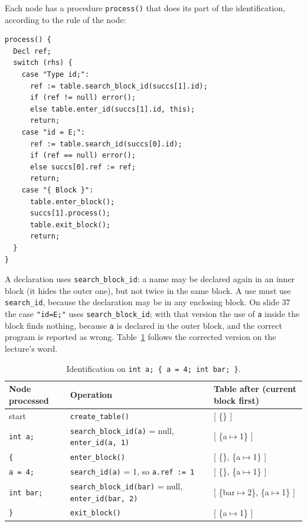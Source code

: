 Each node has a procedure \texttt{process()} that does its part of the
identification, according to the rule of the node:
\begin{lstlisting}
process() {
  Decl ref;
  switch (rhs) {
    case "Type id;":
      ref := table.search_block_id(succs[1].id);
      if (ref != null) error();
      else table.enter_id(succs[1].id, this);
      return;
    case "id = E;":
      ref := table.search_id(succs[0].id);
      if (ref == null) error();
      else succs[0].ref := ref;
      return;
    case "{ Block }":
      table.enter_block();
      succs[1].process();
      table.exit_block();
      return;
  }
}
\end{lstlisting}
A declaration uses \texttt{search\_block\_id}: a name may be declared again in
an inner block (it hides the outer one), but not twice in the same block. A
use must use \texttt{search\_id}, because the declaration may be in any
enclosing block. On slide 37 the case \texttt{"id=E;"} uses
\texttt{search\_block\_id}; with that version the use of \texttt{a} inside the
block finds nothing, because \texttt{a} is declared in the outer block, and the
correct program is reported as wrong. Table~\ref{tab:process} follows the
corrected version on the lecture's word.

\begin{table}[h]
\centering
\small
\begin{tabular}{l l l}
  \toprule
  Node processed & Operation & Table after (current block first) \\
  \midrule
  start              & \texttt{create\_table()}                 & [ \{\} ] \\
  \texttt{int a;}    & \texttt{search\_block\_id(a)} = null, \texttt{enter\_id(a, 1)} & [ \{a$\mapsto$1\} ] \\
  \texttt{\{}        & \texttt{enter\_block()}                  & [ \{\}, \{a$\mapsto$1\} ] \\
  \texttt{a = 4;}    & \texttt{search\_id(a)} = 1, so \texttt{a.ref := 1} & [ \{\}, \{a$\mapsto$1\} ] \\
  \texttt{int bar;}  & \texttt{search\_block\_id(bar)} = null, \texttt{enter\_id(bar, 2)} & [ \{bar$\mapsto$2\}, \{a$\mapsto$1\} ] \\
  \texttt{\}}        & \texttt{exit\_block()}                   & [ \{a$\mapsto$1\} ] \\
  \bottomrule
\end{tabular}
\caption{Identification on \texttt{int a; \{ a = 4; int bar; \}}.}
\label{tab:process}
\end{table}

